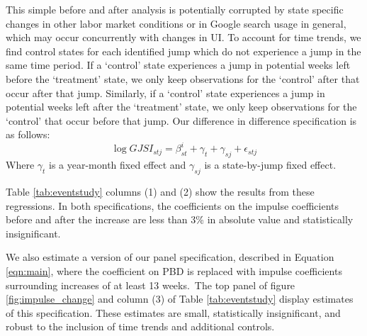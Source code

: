 \documentclass[12pt]{article}
\begin{document}
\begin{spacing}{2}
This simple before and after analysis is potentially corrupted by state specific changes in other labor market conditions or in Google search usage in general, which may occur concurrently with changes in UI. To account for time trends, we find control states for each identified jump which do not experience a jump in the same time period. If a `control' state experiences a jump in potential weeks left before the `treatment' state, we only keep observations for the `control' after that occur after that jump. Similarly, if a `control' state experiences a jump in potential weeks left after the `treatment' state, we only keep observations for the `control' that occur before that jump. Our difference in difference specification is as follows:
\begin{equation}\label{eqn:befandafdiff}
\log{GJSI_{stj}} = \beta^{i}_{st} + \gamma_{t} + \gamma_{sj} + \epsilon_{stj}
\end{equation}
Where $\gamma_{t}$ is a year-month fixed effect and $\gamma_{sj}$ is a state-by-jump fixed effect.\footnotemark
{} 

Table \ref{tab:eventstudy} columns (1) and (2) show the results from these regressions. In both specifications, the coefficients on the impulse coefficients before and after the increase are less than 3\% in absolute value and statistically insignificant.

We also estimate a version of our panel specification, described in Equation \ref{eqn:main}, where the coefficient on PBD is replaced with impulse coefficients surrounding increases of at least 13 weeks.\footnotemark \ The top panel of figure \ref{fig:impulse_change} and column (3) of Table \ref{tab:eventstudy} display estimates of this specification. These estimates are small, statistically insignificant, and robust to the inclusion of time trends and additional controls. 


\end{spacing}
\end{document}
